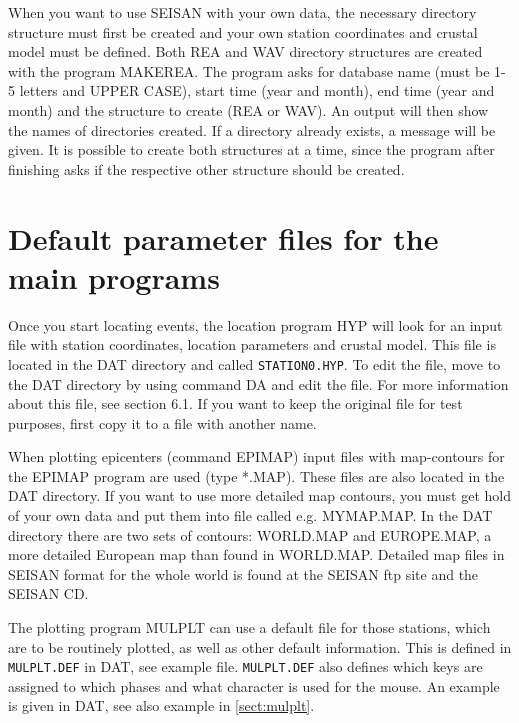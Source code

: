 When you want to use SEISAN with your own data, the necessary directory structure must first be created and your own station coordinates and crustal model must be defined. Both REA and WAV directory structures are created with the program MAKEREA. The program asks for database name (must be 1-5 letters and UPPER CASE), start time (year and month), end time (year and month) and the structure to create (REA or WAV). An output will then show the names of directories created. If a directory already exists, a message will be given. It is possible to create both structures at a time, since the program after finishing asks if the respective other structure should be created. 

\section{Default parameter files for the main programs}

Once you start locating events, the location program HYP will look for an input file with station coordinates, location parameters and crustal model. This file is located in the DAT directory and called \texttt{STATION0.HYP}. To edit the file, move to the DAT directory by using command DA and edit the file. For more information about this file, see section 6.1. If you want to keep the original file for test purposes, first copy it to a file with another name. 

When plotting epicenters (command EPIMAP) input files with map-contours for the EPIMAP program are used (type *.MAP). These files are also located in the DAT directory.  If you want to use more detailed map contours, you must get hold of your own data and put them into file called e.g. MYMAP.MAP. In the DAT directory there are two sets of contours: WORLD.MAP and EUROPE.MAP, a more detailed European map than found in WORLD.MAP. Detailed map files in SEISAN format for the whole world is found at the SEISAN ftp site and the SEISAN CD. 

The plotting program MULPLT can use a default file for those stations, which are to be routinely plotted, as well as other default information. This is defined in \texttt{MULPLT.DEF} in DAT, see example file. \texttt{MULPLT.DEF} also defines which keys are assigned to which phases and what character is used for the mouse. An example is given in DAT, see also example in \ref{sect:mulplt}. 

